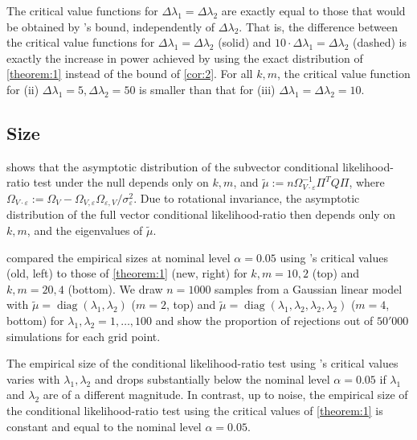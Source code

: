 \documentclass[11pt,hidelinks,a4paper]{article}
\DeclareMathOperator{\diag}{diag}
\begin{document}
The critical value functions for $\Delta \lambda_1 = \Delta \lambda_2$ are exactly equal to those that would be obtained by \citeauthor{kleibergen2007generalizing}'s \citeyearpar{kleibergen2007generalizing} bound, independently of $\Delta \lambda_2$.
That is, the difference between the critical value functions for $\Delta \lambda_1 = \Delta \lambda_2$ (solid) and $10 \cdot \Delta \lambda_1 = \Delta \lambda_2$ (dashed) is exactly the increase in power achieved by using the exact distribution of \cref{theorem:1} instead of the bound of \cref{cor:2}.
For all $k, m$, the critical value function for (ii) $\Delta \lambda_1 = 5, \Delta \lambda_2 = 50$ is smaller than that for (iii) $\Delta \lambda_1 = \Delta \lambda_2 = 10$.










\subsection*{Size}
\citet{kleibergen2021efficient} shows that the asymptotic distribution of the subvector conditional likelihood-ratio test under the null depends only on $k, m$, and $\tilde \mu := n\Omega_{V \cdot \varepsilon}^{-1} \Pi^T Q \Pi$, where $\Omega_{V \cdot \varepsilon} := \Omega_V - \Omega_{V, \varepsilon} \Omega_{\varepsilon, V} / \sigma^2_\varepsilon$.
Due to rotational invariance, the asymptotic distribution of the full vector conditional likelihood-ratio then depends only on $k, m$, and the eigenvalues of $\tilde \mu$.

 compared the empirical sizes at nominal level $\alpha = 0.05$ using \citeauthor{kleibergen2007generalizing}'s \citeyearpar{kleibergen2007generalizing} critical values (old, left) to those of \cref{theorem:1} (new, right) for $k, m = 10, 2$ (top) and $k, m = 20, 4$ (bottom).
We draw $n=1000$ samples from a Gaussian linear model with $\tilde \mu = \diag(\lambda_1, \lambda_2)$ ($m=2$, top) and $\tilde \mu = \diag(\lambda_1, \lambda_2, \lambda_2, \lambda_2)$ ($m=4$, bottom) for $\lambda_1, \lambda_2 = 1, \ldots, 100$ and show the proportion of rejections out of $50'000$ simulations for each grid point.

The empirical size of the conditional likelihood-ratio test using  \citeauthor{kleibergen2007generalizing}'s \citeyearpar{kleibergen2007generalizing} critical values varies with $\lambda_1, \lambda_2$ and drops substantially below the nominal level $\alpha = 0.05$ if $\lambda_1$ and $\lambda_2$ are of a different magnitude.
In contrast, up to noise, the empirical size of the conditional likelihood-ratio test using the critical values of \cref{theorem:1} is constant and equal to the nominal level $\alpha = 0.05$.
\end{document}
